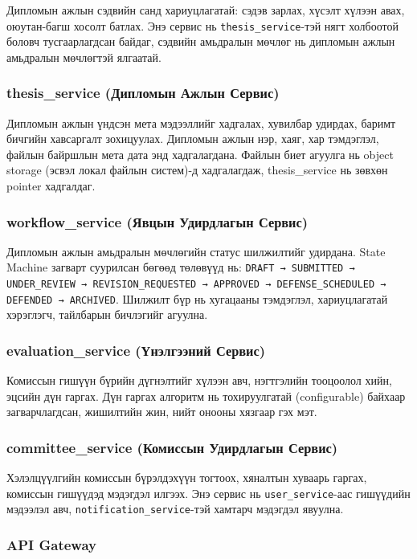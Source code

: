 Дипломын ажлын сэдвийн санд хариуцлагатай: сэдэв зарлах, хүсэлт
хүлээн авах, оюутан-багш хосолт батлах. Энэ сервис нь
\texttt{thesis\_service}-тэй нягт холбоотой боловч тусгаарлагдсан
байдаг, сэдвийн амьдралын мөчлөг нь дипломын ажлын амьдралын
мөчлөгтэй ялгаатай.

\subsubsection{thesis\_service (Дипломын Ажлын Сервис)}

Дипломын ажлын үндсэн мета мэдээллийг хадгалах, хувилбар удирдах,
баримт бичгийн хавсаргалт зохицуулах. Дипломын ажлын нэр, хаяг, хар
тэмдэглэл, файлын байршлын мета дата энд хадгалагдана. Файлын биет
агуулга нь object storage (эсвэл локал файлын систем)-д хадгалагдаж,
thesis\_service нь зөвхөн pointer хадгалдаг.

\subsubsection{workflow\_service (Явцын Удирдлагын Сервис)}

Дипломын ажлын амьдралын мөчлөгийн статус шилжилтийг удирдана.
State Machine загварт суурилсан бөгөөд төлөвүүд нь:
\texttt{DRAFT → SUBMITTED → UNDER\_REVIEW → REVISION\_REQUESTED →
APPROVED → DEFENSE\_SCHEDULED → DEFENDED → ARCHIVED}.
Шилжилт бүр нь хугацааны тэмдэглэл, хариуцлагатай хэрэглэгч,
тайлбарын бичлэгийг агуулна.

\subsubsection{evaluation\_service (Үнэлгээний Сервис)}

Комиссын гишүүн бүрийн дүгнэлтийг хүлээн авч, нэгтгэлийн тооцоолол
хийн, эцсийн дүн гаргах. Дүн гаргах алгоритм нь тохируулгатай
(configurable) байхаар загварчлагдсан, жишилтийн жин, нийт онооны
хязгаар гэх мэт.

\subsubsection{committee\_service (Комиссын Удирдлагын Сервис)}

Хэлэлцүүлгийн комиссын бүрэлдэхүүн тогтоох, хяналтын хуваарь
гаргах, комиссын гишүүдэд мэдэгдэл илгээх. Энэ сервис нь
\texttt{user\_service}-аас гишүүдийн мэдээлэл авч,
\texttt{notification\_service}-тэй хамтарч мэдэгдэл явуулна.

\subsubsection{API Gateway}

